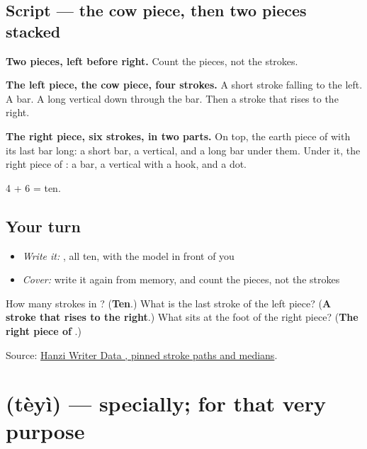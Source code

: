 \subsection*{Script — the cow piece, then two pieces stacked}

\begin{quote}
\end{quote}

\textbf{Two pieces, left before right.} Count the pieces, not the strokes.

\textbf{The left piece, the cow piece, four strokes.} A short stroke falling to the left. A bar. A long vertical down through the bar. Then a stroke that rises to the right.

\textbf{The right piece, six strokes, in two parts.} On top, the earth piece of  with its last bar long: a short bar, a vertical, and a long bar under them. Under it, the right piece of : a bar, a vertical with a hook, and a dot.

4 + 6 = ten.

\subsection*{Your turn}
\begin{itemize}
\raggedright
  \item \emph{Write it:} , all ten, with the model in front of you
  \item \emph{Cover:} write it again from memory, and count the pieces, not the strokes
\end{itemize}

\begin{tcolorbox}[breakable,colback=teal!4,colframe=teal!35!black,title={Before you move on}]
How many strokes in ? (\textbf{Ten}.) What is the last stroke of the left piece? (\textbf{A stroke that rises to the right}.) What sits at the foot of the right piece? (\textbf{The right piece of }.)

Source: \href{https://raw.githubusercontent.com/chanind/hanzi-writer-data/68d10a4b21150cae5e1ebbd223eed289cf32d90c/data/\%E7\%89\%B9.json}{Hanzi Writer Data , pinned stroke paths and medians}.
\end{tcolorbox}
\section[\texorpdfstring{\zh{特意} (tèyì)}{特意 (tèyì)}]{ (tèyì) — specially; for that very purpose}


